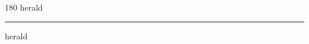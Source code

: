 
\begin{frame}
\begin{center}
\begin{turn}{180}
{\fontsize{2.5cm}{1em}\selectfont herald}
\end{turn}
\vspace{1em}\par  
\hrule
\vspace{1em}\par  
{\fontsize{2.5cm}{1em}\selectfont herald}
\end{center}
\end{frame}
